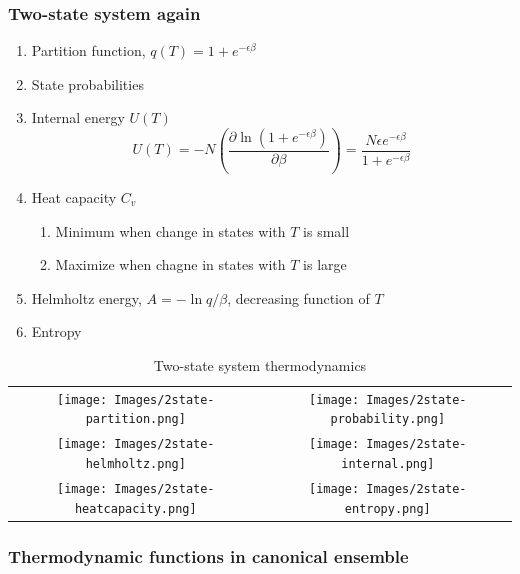 \documentclass[11pt]{article}
\begin{document}
\subsubsection{Two-state system again}
\label{sec:org432e453}
\begin{enumerate}
\item Partition function, \(q(T)=1+e^{-\epsilon\beta}\)
\item State probabilities
\item Internal energy \(U(T)\)
\begin{equation}
  U(T)=-N \left ( \frac{\partial \ln(1+e^{-\epsilon\beta})}{\partial\beta}
  \right)=\frac{N\epsilon e^{-\epsilon\beta}}{1+e^{-\epsilon\beta}}
\end{equation}
\item Heat capacity \(C_v\)
\begin{enumerate}
\item Minimum when change in states with \(T\) is small
\item Maximize when chagne in states with \(T\) is large
\end{enumerate}
\item Helmholtz energy, \(A= -\ln q/\beta\), decreasing function of \(T\)
\item Entropy
\end{enumerate}

\begin{table}
   \caption{Two-state system thermodynamics}
\begin{tabular}{cc}
\texttt{[image: Images/2state-partition.png]} & \texttt{[image: Images/2state-probability.png]} \\
\texttt{[image: Images/2state-helmholtz.png]} & \texttt{[image: Images/2state-internal.png]} \\
\texttt{[image: Images/2state-heatcapacity.png]} & \texttt{[image: Images/2state-entropy.png]}
\end{tabular}
\end{table}

\subsubsection{Thermodynamic functions in canonical ensemble}
\label{sec:org20d007d}
\end{document}
